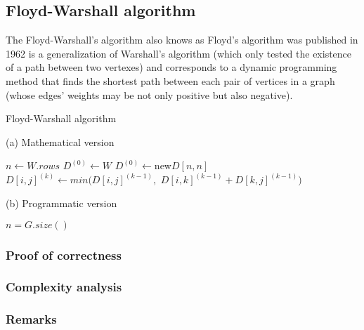 \subsection{Floyd-Warshall algorithm} \label{algorithm-shortestpath-floydwarshall}
The Floyd-Warshall's algorithm also knows as Floyd's algorithm was published in 1962 is a generalization of Warshall's algorithm 
(which only tested the existence of a path between two vertexes) and corresponds to a dynamic programming method 
that finds the shortest path between each pair of vertices in a graph (whose edges' weights may be not only positive but also negative).

\begin{algorithm}[ht]
    \caption{Floyd-Warshall algorithm}
    \label{alg:held-karp}
    \begin{minipage}[t]{0.49\linewidth}
        (a) Mathematical version
        \begin{algorithmic}[1]
                \State $n \gets W.rows$
                \State $D^{(0)} \gets W$
                    \State $D^{(0)} \gets $new$ D[n, n]$
                            \State $D[i,j]^{(k)} \gets min( D[i,j]^{(k-1)},$
                            $D[i,k]^{(k-1)} + D[k,j]^{(k-1)} )$
                        \EndFor
                    \EndFor
                \EndFor
                \State {}
            \EndFunction
        \end{algorithmic}
    \end{minipage}
    \begin{minipage}[t]{0.49\linewidth}
        (b) Programmatic version
        \begin{algorithmic}[1]
            \State $n = G.size()$
            \EndFunction
        \end{algorithmic}
    \end{minipage}
\end{algorithm}
\subsubsection{Proof of correctness}

\subsubsection{Complexity analysis}

\subsubsection{Remarks}
